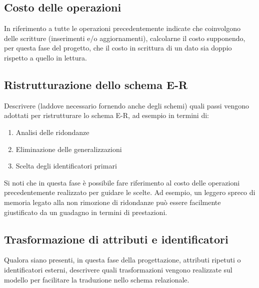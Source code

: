 \subsection*{Costo delle operazioni}

\begin{templateblock}
    In riferimento a tutte le operazioni precedentemente indicate che
    coinvolgono delle scritture (inserimenti e/o aggiornamenti), calcolarne
    il costo supponendo, per questa fase del progetto, che il costo in
    scrittura di un dato sia doppio rispetto a quello in lettura.
\end{templateblock}

\subsection*{Ristrutturazione dello schema E-R}

\begin{templateblock}
    Descrivere (laddove necessario fornendo anche degli schemi) quali passi
    vengono adottati per ristrutturare lo schema E-R, ad esempio in
    termini di:
    \begin{enumerate}
        \item Analisi delle ridondanze
        \item Eliminazione delle generalizzazioni
        \item Scelta degli identificatori primari
    \end{enumerate}
    Si noti che in questa fase è possibile fare riferimento al costo delle
    operazioni precedentemente realizzato per guidare le scelte.
    Ad esempio, un leggero spreco di memoria legato alla non rimozione di
    ridondanze può essere facilmente giustificato da un guadagno in termini
    di prestazioni.
\end{templateblock}

\subsection*{Trasformazione di attributi e identificatori}

\begin{templateblock}
    Qualora siano presenti, in questa fase della progettazione, attributi
    ripetuti o identificatori esterni, descrivere quali trasformazioni
    vengono realizzate sul modello per facilitare la traduzione nello
    schema relazionale.
\end{templateblock}

